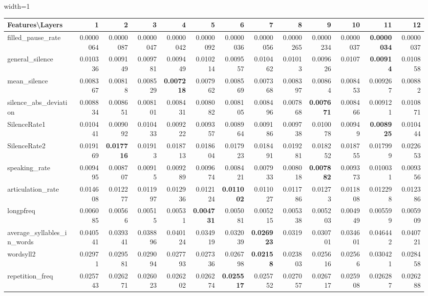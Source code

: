 \documentclass[sigconf]{acmart}
\newcommand{\wv}{wav2vec2.0\xspace}
\begin{document}
\begin{table*}[]
\begin{adjustbox}{width=1\textwidth}
\begin{tabular}{@{}l|rrrrrrrrrrrr@{}}
\toprule
\textbf{Features\textbackslash{}Layers} & 1 & 2 & 3 & 4 & 5 & 6 & 7 & 8 & 9 & 10 & 11 & 12 \\ \midrule
filled\_pause\_rate & 0.0000064 & 0.0000087 & 0.0000047 & 0.0000042 & 0.0000092 & 0.0000036 & 0.0000056 & 0.0000265 & 0.0000234 & 0.0000037 & \textbf{0.0000034} & 0.0000037 \\
general\_silence & 0.010336 & 0.009149 & 0.009781 & 0.009449 & 0.010214 & 0.009557 & 0.010462 & 0.01013 & 0.009626 & 0.0107 & \textbf{0.00914} & 0.010858 \\
mean\_silence & 0.008367 & 0.00818 & 0.008529 & \textbf{0.007218} & 0.007962 & 0.008569 & 0.007368 & 0.008397 & 0.00864 & 0.008453 & 0.009267 & 0.00882 \\
silence\_abs\_deviation & 0.008834 & 0.008651 & 0.008101 & 0.008431 & 0.008082 & 0.008105 & 0.008496 & 0.007868 & \textbf{0.007671} & 0.008466 & 0.009121 & 0.010871 \\
SilenceRate1 & 0.010441 & 0.009092 & 0.010433 & 0.009222 & 0.009357 & 0.008964 & 0.009186 & 0.009738 & 0.010078 & 0.00949 & \textbf{0.008925} & 0.010444 \\
SilenceRate2 & 0.019169 & \textbf{0.017716} & 0.01913 & 0.018713 & 0.018604 & 0.017923 & 0.018491 & 0.019281 & 0.018252 & 0.018755 & 0.017999 & 0.022653 \\
speaking\_rate & 0.009495 & 0.008707 & 0.00915 & 0.009289 & 0.009674 & 0.008421 & 0.007933 & 0.008018 & \textbf{0.007882} & 0.009373 & 0.010031 & 0.009356 \\
articulation\_rate & 0.014608 & 0.012277 & 0.011997 & 0.012936 & 0.012124 & \textbf{0.011002} & 0.011027 & 0.011786 & 0.01273 & 0.011808 & 0.012298 & 0.012386 \\
longpfreq & 0.006085 & 0.00566 & 0.00515 & 0.00531 & \textbf{0.004731} & 0.005081 & 0.005215 & 0.005338 & 0.005203 & 0.004949 & 0.005599 & 0.005909 \\
average\_syllables\_in\_words & 0.040541 & 0.039341 & 0.038896 & 0.040124 & 0.034919 & 0.032039 & \textbf{0.026923} & 0.0319 & 0.030701 & 0.034601 & 0.046442 & 0.040721 \\
wordsyll2 & 0.02971 & 0.029581 & 0.029094 & 0.027793 & 0.027336 & 0.026798 & \textbf{0.02158} & 0.023803 & 0.025616 & 0.02566 & 0.030421 & 0.028458 \\
repetition\_freq & 0.025743 & 0.026271 & 0.026023 & 0.026202 & 0.026274 & \textbf{0.025517} & 0.025752 & 0.027057 & 0.026717 & 0.025908 & 0.026287 & 0.026288\\ \bottomrule
\end{tabular}
\end{adjustbox}
\vspace{1 mm}
\caption{\label{nFluency_W}  \small Results (MSE) for fluency features on {\wv} for non-native read speech corpus (L2 Arctic)}

\end{table*}
\end{document}
